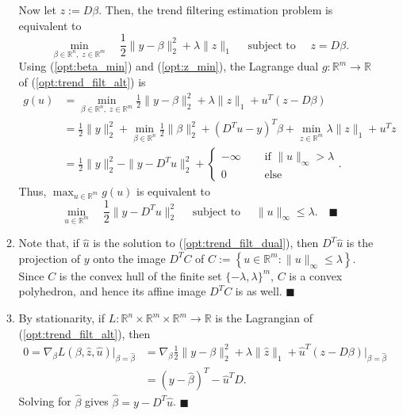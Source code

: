 \documentclass[11pt]{article}
\renewcommand{\qed}{\quad \ensuremath{\blacksquare}}
\newcommand{\R}{\mathbb{R}} %
\renewcommand{\hat}{\widehat}
\begin{document}
\begin{enumerate}
\begin{enumerate}
Now let $z := D\beta$. Then, the trend filtering estimation problem is
equivalent to
\begin{equation}
\min_{\beta \in \R^n, \; z \in \R^m}
                        \quad \frac12 \|y - \beta\|_2^2 + \lambda \|z\|_1
          \quad \mbox{ subject to } \quad z = D \beta.
\label{opt:trend_filt_alt}
\end{equation}
Using (\ref{opt:beta_min}) and (\ref{opt:z_min}), the Lagrange dual
$g : \R^m \to \R$ of (\ref{opt:trend_filt_alt}) is
\begin{align*}
g(u)
 &  = \min_{\beta \in \R^n, \; z \in \R^m}
            \frac12 \|y - \beta\|_2^2 + \lambda \|z\|_1 + u^T (z - D \beta) \\
 &  = \frac12 \|y\|_2^2
    + \min_{\beta \in \R^n} \frac12 \|\beta\|_2^2 + (D^T u - y)^T\beta
    + \min_{z \in \R^m} \lambda \|z\|_1 + u^T z \\
 &  = \frac12 \|y\|_2^2 - \|y - D^T u\|_2^2
    + \left\{ \begin{array}{ll}
                    -\infty & \quad \mbox{ if } \|u\|_\infty > \lambda \\
                    0       & \quad \mbox{ else }
                \end{array} \right..
\end{align*}
Thus, $\max_{u \in \R^m} g(u)$ is equivalent to
\begin{equation}
\min_{u \in \R^m}
                        \quad \frac12 \|y - D^T u\|_2^2
          \quad \mbox{ subject to } \quad \|u\|_\infty \leq \lambda.    \qed
\label{opt:trend_filt_dual}
\end{equation}

\item Note that, if $\hat u$ is the solution to (\ref{opt:trend_filt_dual}),
then $D^T \hat u$ is the projection of $y$ onto the image $D^TC$ of
$C := \left\{ u \in \R^m : \|u\|_\infty \leq \lambda \right\}$. Since $C$ is
the convex hull of the finite set $\{-\lambda,\lambda\}^m$, $C$ is a convex
polyhedron, and hence its affine image $D^TC$ is as well. \qed

\item By stationarity, if $L : \R^n \times \R^m \times \R^m \to \R$ is the
Lagrangian of (\ref{opt:trend_filt_alt}), then
\begin{align*}
0
    = \nabla_\beta L(\beta,\hat z,\hat u) \bigg|_{\beta = \hat\beta}
 &  = \nabla_\beta \frac{1}{2} \|y - \beta\|_2^2 + \lambda\|\hat z\|_1
                        + \hat u^T(z - D\beta) \bigg|_{\beta = \hat\beta}   \\
 &  = (y - \hat\beta)^T - \hat u^TD.
\end{align*}
Solving for $\hat\beta$ gives $\hat\beta = y - D^T \hat u$. \qed



\end{enumerate}
\end{enumerate}
\end{document}
